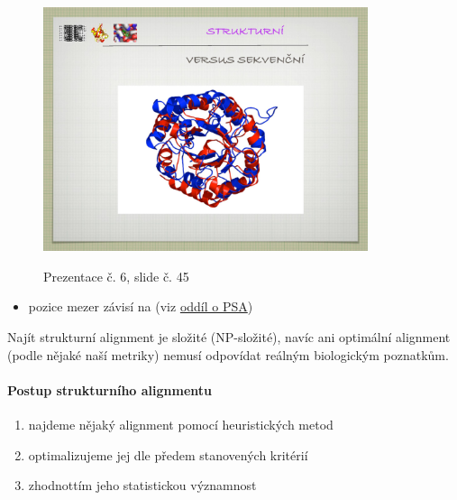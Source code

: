 \documentclass[DIV=8]{scrreprt}
\begin{document}
\begin{itemize}[nosep]
\begin{figure}
    \centering
    \label{slides-6-slide-43}
\end{figure}
\begin{figure}
    \caption{Prezentace č. 6, slide č. 45}
    \includegraphics[width=0.85\textwidth]{slides-6/slide-45.jpg}
    \centering
    \label{slides-6-slide-45}
\end{figure}

\begin{itemize}[nosep]
    \item pozice mezer závisí na (viz \hyperref[Pairwise sequence alignment]{oddíl o PSA})
\end{itemize}

\end{itemize}



Najít strukturní alignment je složité (NP-složité), navíc ani optimální alignment (podle nějaké naší metriky) nemusí odpovídat reálným biologickým poznatkům.

\paragraph{Postup strukturního alignmentu}
\begin{enumerate}[nosep]
    \item najdeme nějaký alignment pomocí heuristických metod
    \item optimalizujeme jej dle předem stanovených kritérií
    \item zhodnottím jeho statistickou významnost
\end{enumerate}
\end{document}

